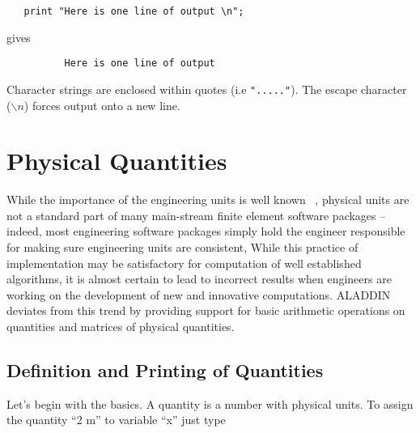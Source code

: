 \begin{footnotesize}
\begin{verbatim}
   print "Here is one line of output \n";
\end{verbatim}
\end{footnotesize}

\vspace{0.05 in}\noindent
gives

\begin{footnotesize}
\begin{verbatim}
          Here is one line of output
\end{verbatim}
\end{footnotesize}

\vspace{0.10 in}\noindent
Character strings are enclosed within quotes (i.e {\tt "....."}).
The escape character ({\tt $\backslash n$})
forces output onto a new line.

\newpage
\section{Physical Quantities}

\vspace{0.15 in}
\noindent\hspace{0.50 in}
While the importance of the engineering units is well known ~\cite{cmelik88,gehani82,karr78},
physical units are not a standard part of many main-stream finite element
software packages -- indeed, most engineering software packages simply
hold the engineer responsible for making sure engineering units are consistent,
While this practice of implementation may be satisfactory for
computation of well established algorithms, it is almost certain
to lead to incorrect results when engineers are working on the
development of new and innovative computations.
ALADDIN deviates from this trend by providing support
for basic arithmetic operations on quantities and matrices of physical quantities.

\subsection{Definition and Printing of Quantities}

\vspace{0.15 in}
\noindent\hspace{0.50 in}
Let's begin with the basics.  A quantity is a number with physical units.
To assign the quantity ``2 m'' to variable ``x'' just type

